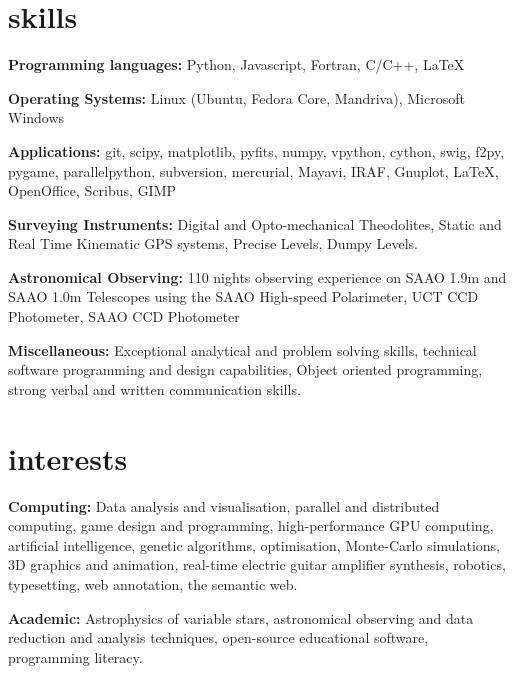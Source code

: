 \documentclass[]{friggeri-cv} %
\begin{document}
\section{skills}

\textbf{Programming languages:} Python, Javascript, Fortran, C/C++, \LaTeX 

\textbf{Operating Systems:} Linux (Ubuntu, Fedora Core, Mandriva), Microsoft Windows 

\textbf{Applications:} git, scipy, matplotlib, pyfits, numpy, vpython, cython, swig, f2py, pygame, parallelpython, subversion, mercurial, Mayavi, IRAF, Gnuplot, \LaTeX, OpenOffice, Scribus, GIMP

\textbf{Surveying Instruments:} Digital and Opto-mechanical Theodolites, Static and Real Time Kinematic GPS
    systems, Precise Levels, Dumpy Levels.
    
\textbf{Astronomical Observing:} 110 nights observing experience on SAAO 1.9m and SAAO 1.0m Telescopes using
     the SAAO High-speed Polarimeter, UCT CCD Photometer, SAAO CCD Photometer

\textbf{Miscellaneous:} Exceptional analytical and problem solving skills, technical software programming and design capabilities, Object oriented programming, strong verbal and written communication skills.



\begin{entrylist}
\end{entrylist}

\section{interests}

\textbf{Computing:} Data analysis and visualisation, parallel and distributed computing, game design and programming, high-performance GPU computing, artificial intelligence, genetic algorithms, optimisation, Monte-Carlo simulations, 3D graphics and animation, real-time electric guitar amplifier synthesis, robotics, typesetting, web annotation, the semantic web.

\textbf{Academic:} Astrophysics of variable stars, astronomical observing and data reduction and analysis techniques, open-source educational software, programming literacy.
\end{document}
